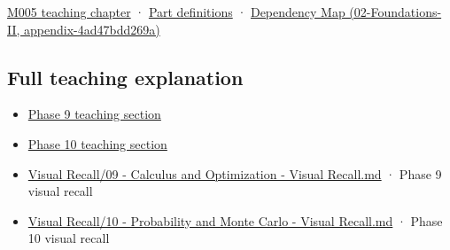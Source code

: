 \href{Continuous\%20Notes/Computing\%20Foundations\%20-\%20From\%20Bits\%20to\%20C++\%20and\%20Systems\%20APIs\#When\%20arithmetic\%20meets\%20uncertainty}{M005 teaching chapter} · \hyperref[appendix-fd090d982a15]{Part definitions} · \href{}{Dependency Map (02-Foundations-II, appendix-4ad47bdd269a)}

\subsection{Full teaching explanation}\label{full-teaching-explanation}

\begin{itemize}
\tightlist
\item
  \href{Continuous\%20Notes/Computing\%20Foundations\%20-\%20From\%20Bits\%20to\%20C++\%20and\%20Systems\%20APIs\#Numerical\%20differentiation\%20and\%20automatic\%20differentiation}{Phase 9 teaching section}
\item
  \href{Continuous\%20Notes/Computing\%20Foundations\%20-\%20From\%20Bits\%20to\%20C++\%20and\%20Systems\%20APIs\#10.\%20Inference\%20and\%20error\%20metrics\%20need\%20explicit\%20assumptions}{Phase 10 teaching section}
\item
  \hyperref[appendix-adf48f5dc5c1]{Visual Recall/09 - Calculus and Optimization - Visual Recall.md} · Phase 9 visual recall
\item
  \hyperref[appendix-cb5af353ef77]{Visual Recall/10 - Probability and Monte Carlo - Visual Recall.md} · Phase 10 visual recall
\end{itemize}
